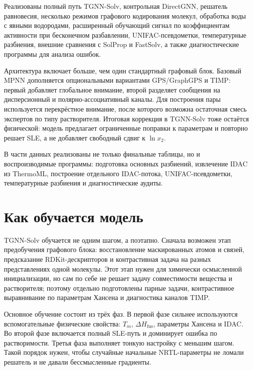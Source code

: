 \documentclass[11pt]{article}
\begin{document}
Реализованы полный путь TGNN-Solv, контрольная DirectGNN, решатель равновесия, несколько режимов графового кодирования молекул, обработка воды с явными водородами, расширенный обучающий сигнал по коэффициентам активности при бесконечном разбавлении, UNIFAC-псевдометки, температурные разбиения, внешние сравнения с SolProp и FastSolv, а также диагностические программы для анализа ошибок.

Архитектура включает больше, чем один стандартный графовый блок. Базовый MPNN дополняется опциональными вариантами GPS/GraphGPS и TIMP: первый добавляет глобальное внимание, второй разделяет сообщения на дисперсионный и полярно-ассоциативный каналы. Для построения пары используется перекрёстное внимание, после которого возможна остаточная смесь экспертов по типу растворителя. Итоговая коррекция в TGNN-Solv тоже остаётся физической: модель предлагает ограниченные поправки к параметрам и повторно решает SLE, а не добавляет свободный сдвиг к $\ln x_2$.

В части данных реализованы не только финальные таблицы, но и воспроизводимые программы: подготовка основных разбиений, извлечение IDAC из ThermoML, построение отдельного IDAC-потока, UNIFAC-псевдометки, температурные разбиения и диагностические аудиты.

\section{Как обучается модель}

TGNN-Solv обучается не одним шагом, а поэтапно. Сначала возможен этап предобучения графового блока: восстановление маскированных атомов и связей, предсказание RDKit-дескрипторов и контрастивная задача на разных представлениях одной молекулы. Этот этап нужен для химически осмысленной инициализации, но сам по себе не решает задачу совместимости вещества и растворителя; поэтому отдельно подготовлены парные задачи, контрастивное выравнивание по параметрам Хансена и диагностика каналов TIMP.

Основное обучение состоит из трёх фаз. В первой фазе сильнее используются вспомогательные физические свойства: $T_m$, $\Delta H_{\mathrm{fus}}$, параметры Хансена и IDAC. Во второй фазе включается полный SLE-путь и доминирует ошибка по растворимости. Третья фаза выполняет тонкую настройку с меньшим шагом. Такой порядок нужен, чтобы случайные начальные NRTL-параметры не ломали решатель и не давали бессмысленные градиенты.
\end{document}
